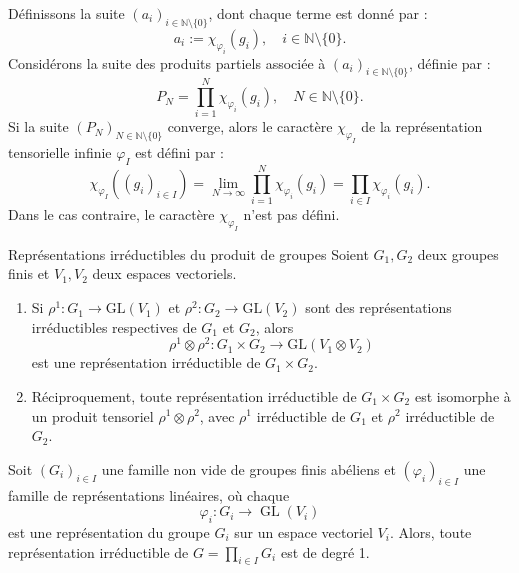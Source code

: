 \documentclass[9pt]{beamer}
\begin{document}
\begin{frame}
	Définissons la suite \( (a_i)_{i \in \mathbb{N} \setminus \{0\} } \), dont chaque terme est donné par :
\[
a_i := \chi_{\varphi_i}(g_i), \quad i \in \mathbb{N} \setminus \{0\}.
\]
Considérons la suite des produits partiels associée à \( (a_i)_{i \in \mathbb{N} \setminus \{0\}} \), définie par :
\[
P_N = \prod_{i=1}^{N} \chi_{\varphi_i}(g_i), \quad N \in \mathbb{N} \setminus \{0\}.
\]
Si la suite \( (P_N)_{N \in \mathbb{N} \setminus \{0\}} \) converge, alors le caractère \( \chi_{\varphi_I} \) de la représentation tensorielle infinie \( \varphi_I \) est défini par :
\[
\chi_{\varphi_I}((g_i)_{i \in I}) = \lim_{N \to \infty} \prod_{i=1}^{N} \chi_{\varphi_i}(g_i) = \prod_{i \in I} \chi_{\varphi_i}(g_i).
\]	
Dans le cas contraire, le caractère \( \chi_{\varphi_I} \) n’est pas défini.
\end{frame}

\begin{frame}{Représentations irréductibles du produit de groupes}
	Soient \( G_1, G_2 \) deux groupes finis et \( V_1, V_2 \) deux espaces vectoriels.
	
	\vspace{0.5em}
	\begin{theorem}
		\begin{enumerate}[label=\roman*)]
			\item Si \( \rho^1 : G_1 \to \mathrm{GL}(V_1) \) et \( \rho^2 : G_2 \to \mathrm{GL}(V_2) \) sont des représentations irréductibles respectives de \( G_1 \) et \( G_2 \), alors
			\[
			\rho^1 \otimes \rho^2 : G_1 \times G_2 \to \mathrm{GL}(V_1 \otimes V_2)
			\]
			est une représentation irréductible de \( G_1 \times G_2 \).
			
			\item Réciproquement, toute représentation irréductible de \( G_1 \times G_2 \) est isomorphe à un produit tensoriel \( \rho^1 \otimes \rho^2 \), avec \( \rho^1 \) irréductible de \( G_1 \) et \( \rho^2 \) irréductible de \( G_2 \).
		\end{enumerate}
	\end{theorem}
	
		\begin{lemma} 
Soit \( (G_i)_{i \in I} \) une famille non vide de groupes finis abéliens et \( (\varphi_i)_{i \in I} \) une famille de représentations linéaires, où chaque  
		\[
		\varphi_i : G_i \to \operatorname{GL}(V_i)
		\]
est une représentation du groupe \( G_i \) sur un espace vectoriel \( V_i \).  
Alors, toute représentation irréductible de \( G =  \prod_{i \in I} G_i \) est de degré 1.
	\end{lemma}
	
\end{frame}
\end{document}
